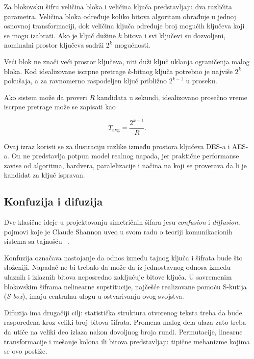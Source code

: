Za blokovsku šifru veličina bloka i veličina ključa predstavljaju dva
različita parametra. Veličina bloka određuje koliko bitova algoritam
obrađuje u jednoj osnovnoj transformaciji, dok veličina ključa određuje
broj mogućih ključeva koji se mogu izabrati. Ako je ključ dužine $k$
bitova i svi ključevi su dozvoljeni, nominalni prostor ključeva sadrži
$2^k$
mogućnosti.

Veći blok ne znači veći prostor ključeva, niti duži ključ uklanja
ograničenja malog bloka. Kod idealizovane iscrpne pretrage $k$-bitnog
ključa potrebno je najviše $2^k$ pokušaja, a za ravnomerno raspodeljen
ključ približno $2^{k-1}$ u proseku.

Ako sistem može da proveri $R$ kandidata u sekundi, idealizovano
prosečno vreme iscrpne pretrage može se zapisati kao

\begin{equation}
    T_{\mathrm{avg}} = \frac{2^{k-1}}{R}.
    \label{eq:bruteforce-time}
\end{equation}

Ovaj izraz koristi se za ilustraciju razlike između
prostora ključeva DES-a i AES-a. On ne predstavlja potpun model realnog
napada, jer praktične performanse zavise od algoritma, hardvera,
paralelizacije i načina na koji se proverava da li je kandidat za ključ
ispravan.


\subsection{Konfuzija i difuzija}
\label{subsec:konfuzija_difuzija}

Dve klasične ideje u projektovanju simetričnih šifara jesu
\emph{confusion} i \emph{diffusion}, pojmovi koje je Claude Shannon
uveo u svom radu o teoriji komunikacionih sistema sa tajnošću
~\cite{shannon-1949}.

Konfuzija označava nastojanje da odnos između tajnog ključa i šifrata
bude što složeniji. Napadač ne bi trebalo da može da iz jednostavnog
odnosa između ulaznih i izlaznih bitova neposredno zaključuje bitove
ključa. U savremenim blokovskim šiframa nelinearne supstitucije,
najčešće realizovane pomoću S-kutija (\emph{S-box}), imaju centralnu
ulogu u ostvarivanju ovog svojstva.

Difuzija ima drugačiji cilj: statistička struktura otvorenog teksta
treba da bude raspoređena kroz veliki broj bitova šifrata. Promena
malog dela ulaza zato treba da utiče na veliki deo izlaza nakon
dovoljnog broja rundi. Permutacije, linearne transformacije i mešanje
kolona ili bitova predstavljaju tipične mehanizme kojima se ovo
postiže.

